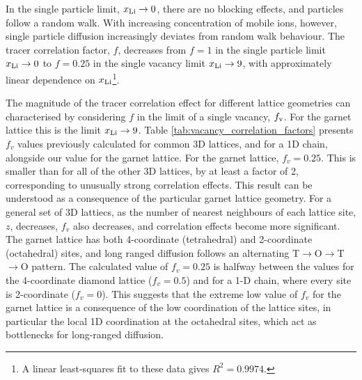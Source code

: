 \documentclass[aps,prb,twocolumn,superscriptaddress,reprint]{revtex4-1}
\newcommand{\xLi}{x_\m{Li}}
\begin{document}
In the single particle limit, $\xLi\to0$, there are no blocking effects, and particles follow a random walk. 
With increasing concentration of mobile ions, however, single particle diffusion increasingly deviates from random walk behaviour. 
The tracer correlation factor, $f$, decreases from $f=1$ in the single particle limit $\xLi\to0$ to $f=0.25$ in the single vacancy limit $\xLi\to9$, with approximately linear dependence on $\xLi$\footnote{A linear least-squares fit to these data gives $R^2=0.9974$.}.

The magnitude of the tracer correlation effect for different lattice geometries can characterised by considering $f$ in the limit of a single vacancy, $f_{\mathrm{v}}$. 
For the garnet lattice this is the limit $\xLi\to9$. 
Table \ref{tab:vacancy_correlation_factors} presents $f_v$ values previously calculated for common 3D lattices,\cite{CompaanAndHaven_TransFaradaySoc1956} and for a 1D chain,\cite{Mehrer_DiffusionBook} alongside our value for the garnet lattice. 
For the garnet lattice, $f_v=0.25$. 
This is smaller than for all of the other 3D lattices, by at least a factor of 2, corresponding to unusually strong correlation effects. 
This result can be understood as a consequence of the particular garnet lattice geometry. 
For a general set of 3D lattiecs, as the number of nearest neighbours of each lattice site, $z$, decreases, $f_v$ also decreases, and correlation effects become more significant. 
The garnet lattice has both 4-coordinate (tetrahedral) and 2-coordinate (octahedral) sites, and long ranged diffusion follows an alternating T$\to$O$\to$T$\to$O pattern. 
The calculated value of $f_v=0.25$ is halfway between the values for the 4-coordinate diamond lattice ($f_v=0.5$) and for a 1-D chain, where every site is 2-coordinate ($f_v=0$). 
This suggests that the extreme low value of $f_v$ for the garnet lattice is a consequence of the low coordination of the lattice sites, in particular the local 1D coordination at the octahedral sites, which act as bottlenecks for long-ranged diffusion. 
\end{document}
